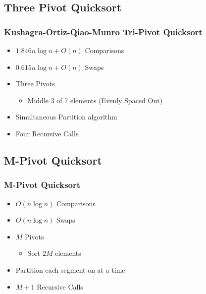 		\subsection{Three Pivot Quicksort}
			\begin{frame}
				\frametitle{Kushagra-Ortiz-Qiao-Munro Tri-Pivot Quicksort}
				\begin{itemize}
					\item<+-> $1.846n \log n + O(n)$ Comparisons
					\item<+-> $0.615n \log n + O(n)$ Swaps
					\item<+-> Three Pivots
					\begin{itemize}
						\item<+-> Middle 3 of 7 elements (Evenly Spaced Out)
					\end{itemize}
					\item<+-> Simultaneous Partition algorithm
					\item<+-> Four Recursive Calls 
				\end{itemize}
				\phantom{ }\cite{kushagra2013multi}
			\end{frame}
		
		\subsection{M-Pivot Quicksort}
			\begin{frame}
				\frametitle{M-Pivot Quicksort}
				\begin{itemize}
					\item<+-> $O(n \log n)$ Comparisons
					\item<+-> $O(n \log n)$ Swaps
					\item<+-> $M$ Pivots
					\begin{itemize}
						\item<+-> Sort $2M$ elements
					\end{itemize}
					\item<+-> Partition each segment on at a time 
					\item<+-> $M+1$ Recursive Calls
				\end{itemize}
				\phantom{ }\cite{kushagra2013multi}
			\end{frame}
		
